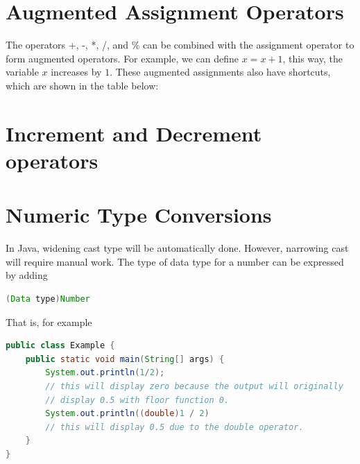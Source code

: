 \documentclass[11pt,a4 paper]{book}
\theoremstyle{plain}
\theoremstyle{definition}
\theoremstyle{remark}
\begin{document}
\begin{flushleft}
\section{Augmented Assignment Operators}
The operators +, -, *, /, and \% can be combined with the assignment operator to form augmented operators.
For example, we can define $x=x+1$, this way, the variable $x$ increases by $1$. These augmented assignments also have shortcuts, which are shown in the table below:
\begin{figure}[H]
\centering
{}
\label{fig:aao}
\end{figure} 
\section{Increment and Decrement operators}
\begin{figure}[H]
\centering
{}
\label{fig:ido}
\end{figure} 
\section{Numeric Type Conversions}
In Java, widening cast type will be automatically done. However, narrowing cast will require manual work.   The type of data type for a number can be expressed by adding 
\begin{lstlisting}[language=Java]
(Data type)Number
\end{lstlisting}
That is, for example
\begin{lstlisting}[language=Java]
public class Example {
	public static void main(String[] args) {
		System.out.println(1/2);
		// this will display zero because the output will originally
		// display 0.5 with floor function 0.
		System.out.println((double)1 / 2) 
		// this will display 0.5 due to the double operator.
	}
}
\end{lstlisting}

\end{flushleft}
\end{document}

